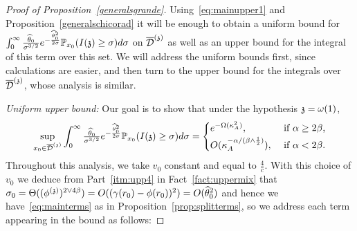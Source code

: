 \begin{proof}[Proof of Proposition~\ref{generalsgrande}]
Using~\eqref{eq:mainupper1} and Proposition~\ref{generalschicorad} it will be enough to obtain a uniform bound for $\int_{0}^{\infty}\frac{\hatt}{\sigma^{3/2}}e^{-\frac{\hatt^2}{2\sigma}}\PP_{x_0}(\II{\ss}\geq\sigma)d\sigma$ on $\ndt$ as well as an upper bound for the integral of this term over this set. We will address the uniform bounds first, since calculations are easier, and then turn to the upper bound for the integrals over $\ndt$, whose analysis is similar.


\medskip

\noindent\textit{Uniform upper bound:} Our goal is to show that under the hypothesis $\ss=\omega(1)$, 
\begin{equation}\label{eq:targetuniform}
\sup_{x_0\in\ndt}\int_{0}^{\infty}\tfrac{\hatt}{\sigma^{3/2}}e^{-\frac{\hatt^2}{2\sigma}}\PP_{x_0}(\II{\ss}\geq\sigma)d\sigma =
\begin{cases}
e^{-\Omega(\KA^2)},
& \text{ if $\alpha\geq2\beta$,} \\[2pt]
O(\KA^{-\alpha/(\beta\wedge\frac12)}),
& \text{ if $\alpha<2\beta$}. 
\end{cases}
\end{equation}
Throughout this analysis, we take $v_0$ constant and equal to $\frac{4}{c}$. With this choice of $v_0$ we deduce from Part~\eqref{itm:upp4} in Fact~\ref{fact:uppermix} that $\sigma_0=\Theta((\phis)^{2\vee4\beta})=O((\gamma(r_0)-\phi(r_0))^2)=O(\hatt^2)$ and hence we have~\eqref{eq:mainterms} as in Proposition~\ref{prop:splitterms}, so we address each term appearing in the bound as follows:


\end{proof}

